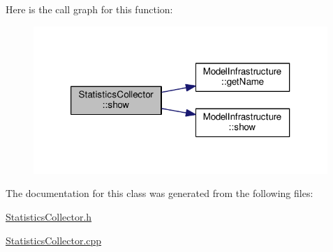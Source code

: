 Here is the call graph for this function\-:
\nopagebreak
\begin{figure}[H]
\begin{center}
\leavevmode
\includegraphics[width=316pt]{class_statistics_collector_a7ce8dad7e29d06c73a01d2ddee93fe00_cgraph}
\end{center}
\end{figure}




The documentation for this class was generated from the following files\-:\begin{DoxyCompactItemize}
\item 
\hyperlink{_statistics_collector_8h}{Statistics\-Collector.\-h}\item 
\hyperlink{_statistics_collector_8cpp}{Statistics\-Collector.\-cpp}\end{DoxyCompactItemize}
